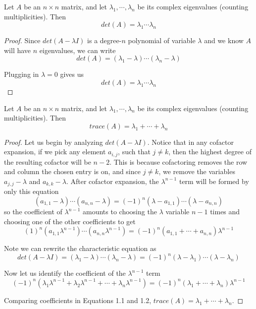 \begin{theorem}
Let $A$ be an $n \times n$ matrix, and let $\lambda_{1}, \cdots, \lambda_{n}$ be its complex eigenvalues (counting multiplicities). Then
$$det(A) = \lambda_{1} \cdots \lambda_{n}$$
\end{theorem}


\begin{proof}
Since $det(A - \lambda I)$ is a degree-$n$ polynomial of variable $\lambda$ and we know $A$ will have $n$ eigenvalues, we can write 
$$det(A) = (\lambda_{1} - \lambda) \cdots (\lambda_{n} - \lambda)$$

Plugging in $\lambda = 0$ gives us 
$$det(A) = \lambda_{1} \cdots \lambda_{n}$$
\end{proof}


\begin{theorem}
Let $A$ be an $n \times n$ matrix, and let $\lambda_{1}, \cdots, \lambda_{n}$ be its complex eigenvalues (counting multiplicities). Then
$$trace(A) = \lambda_{1} + \cdots + \lambda_{n}$$ 
\end{theorem}

\begin{proof}
Let us begin by analyzing $det(A - \lambda I)$. Notice that in any cofactor expansion, if we pick any element $a_{i, j}$, such that $j \neq k$, then the highest degree of the resulting cofactor will be $n - 2$. This is because cofactoring removes the row and column the chosen entry is on, and since $j \neq k$, we remove the variables $a_{j,j} - \lambda$ and $a_{k,k} - \lambda$. After cofactor expansion, the  $\lambda^{n-1}$ term will be formed by only this equation
$$(a_{1,1} - \lambda) \cdots (a_{n, n} - \lambda) = (-1)^{n} (\lambda - a_{1,1}) \cdots (\lambda - a_{n,n})$$
so the coefficient of $\lambda^{n-1}$ amounts to choosing the $\lambda$ variable $n -1$ times and choosing one of the other coefficients to get 
\begin{equation}
(1)^{n}(a_{1, 1} \lambda^{n-1})\cdots (a_{n, n} \lambda^{n-1}) = (-1)^{n} (a_{1, 1} + \cdots + a_{n, n}) \lambda^{n-1}
\end{equation}


Note we can rewrite the characteristic equation as
$$det(A - \lambda I) = (\lambda_{1} - \lambda) \cdots (\lambda_{n} - \lambda) = (-1)^{n} (\lambda - \lambda_{1}) \cdots (\lambda - \lambda_{n})$$

Now let us identify the coefficient of the $\lambda^{n-1}$ term 
\begin{equation}
(-1)^{n} (\lambda_{1} \lambda^{n-1} + \lambda_{2} \lambda^{n-1} + \cdots + \lambda_{n} \lambda^{n-1}) = (-1)^{n} (\lambda_{1} + \cdots + \lambda_{n}) \lambda^{n-1}
\end{equation}

Comparing coefficients in Equations 1.1 and 1.2, $trace(A) = \lambda_{1} + \cdots + \lambda_{n}$. 
\end{proof}

